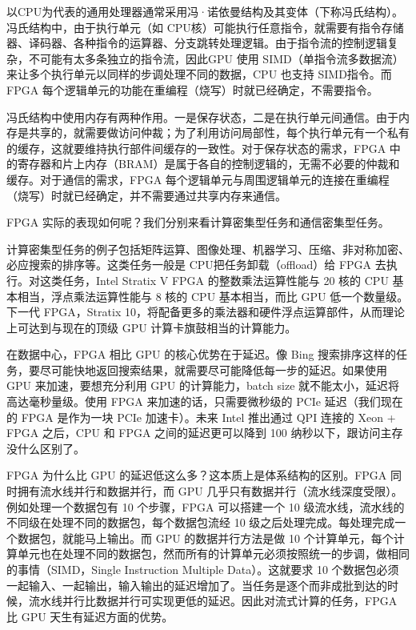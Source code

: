 以CPU为代表的通用处理器通常采用冯·诺依曼结构及其变体（下称冯氏结构）。冯氏结构中，由于执行单元（如 CPU核）可能执行任意指令，就需要有指令存储器、译码器、各种指令的运算器、分支跳转处理逻辑。由于指令流的控制逻辑复杂，不可能有太多条独立的指令流，因此GPU 使用 SIMD（单指令流多数据流）来让多个执行单元以同样的步调处理不同的数据，CPU 也支持 SIMD指令。而 FPGA 每个逻辑单元的功能在重编程（烧写）时就已经确定，不需要指令。

冯氏结构中使用内存有两种作用。一是保存状态，二是在执行单元间通信。由于内存是共享的，就需要做访问仲裁；为了利用访问局部性，每个执行单元有一个私有的缓存，这就要维持执行部件间缓存的一致性。对于保存状态的需求，FPGA 中的寄存器和片上内存（BRAM）是属于各自的控制逻辑的，无需不必要的仲裁和缓存。对于通信的需求，FPGA 每个逻辑单元与周围逻辑单元的连接在重编程（烧写）时就已经确定，并不需要通过共享内存来通信。

FPGA 实际的表现如何呢？我们分别来看计算密集型任务和通信密集型任务。

计算密集型任务的例子包括矩阵运算、图像处理、机器学习、压缩、非对称加密、必应搜索的排序等。这类任务一般是 CPU把任务卸载（offload）给 FPGA 去执行。对这类任务，Intel Stratix V FPGA 的整数乘法运算性能与 20 核的 CPU 基本相当，浮点乘法运算性能与 8 核的 CPU 基本相当，而比 GPU 低一个数量级。下一代 FPGA，Stratix 10，将配备更多的乘法器和硬件浮点运算部件，从而理论上可达到与现在的顶级 GPU 计算卡旗鼓相当的计算能力。

在数据中心，FPGA 相比 GPU 的核心优势在于延迟。像 Bing 搜索排序这样的任务，要尽可能快地返回搜索结果，就需要尽可能降低每一步的延迟。如果使用 GPU 来加速，要想充分利用 GPU 的计算能力，batch size 就不能太小，延迟将高达毫秒量级。使用 FPGA 来加速的话，只需要微秒级的 PCIe 延迟（我们现在的 FPGA 是作为一块 PCIe 加速卡）。未来 Intel 推出通过 QPI 连接的 Xeon + FPGA 之后，CPU 和 FPGA 之间的延迟更可以降到 100 纳秒以下，跟访问主存没什么区别了。

FPGA 为什么比 GPU 的延迟低这么多？这本质上是体系结构的区别。FPGA 同时拥有流水线并行和数据并行，而 GPU 几乎只有数据并行（流水线深度受限）。例如处理一个数据包有 10 个步骤，FPGA 可以搭建一个 10 级流水线，流水线的不同级在处理不同的数据包，每个数据包流经 10 级之后处理完成。每处理完成一个数据包，就能马上输出。而 GPU 的数据并行方法是做 10 个计算单元，每个计算单元也在处理不同的数据包，然而所有的计算单元必须按照统一的步调，做相同的事情（SIMD，Single Instruction Multiple Data）。这就要求 10 个数据包必须一起输入、一起输出，输入输出的延迟增加了。当任务是逐个而非成批到达的时候，流水线并行比数据并行可实现更低的延迟。因此对流式计算的任务，FPGA 比 GPU 天生有延迟方面的优势。

